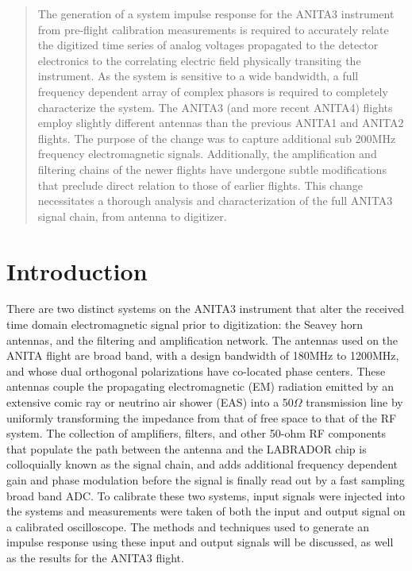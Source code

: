 %
%
%
%

	\begin{abstract}
	The generation of a system impulse response for the ANITA3 instrument from pre-flight calibration measurements is required to accurately relate the digitized time series of analog voltages propagated to the detector electronics to the correlating electric field physically transiting the instrument.  As the system is sensitive to a wide bandwidth, a full frequency dependent array of complex phasors is required to completely characterize the system.  The ANITA3 (and more recent ANITA4) flights employ slightly different antennas than the previous ANITA1 and ANITA2 flights.  The purpose of the change was to capture additional sub 200MHz frequency electromagnetic signals.  Additionally, the amplification and filtering chains of the newer flights have undergone subtle modifications that preclude direct relation to those of earlier flights.  This change necessitates a thorough analysis and characterization of the full ANITA3 signal chain, from antenna to digitizer.
	\end{abstract}
	
\section{Introduction}

	There are two distinct systems on the ANITA3 instrument that alter the received time domain electromagnetic signal prior to digitization: the Seavey horn antennas, and the filtering and amplification network.  The antennas used on the ANITA flight are broad band, with a design bandwidth of 180MHz to 1200MHz, and whose dual orthogonal polarizations have co-located phase centers.  These antennas couple the propagating electromagnetic (EM) radiation emitted by an extensive comic ray or neutrino air shower (EAS) into a 50$\Omega$ transmission line by uniformly transforming the impedance from that of free space to that of the RF system.  The collection of amplifiers, filters, and other 50-ohm RF components that populate the path between the antenna and the LABRADOR chip is colloquially known as the signal chain, and adds additional frequency dependent gain and phase modulation before the signal is finally read out by a fast sampling broad band ADC.  To calibrate these two systems, input signals were injected into the systems and measurements were taken of both the input and output signal on a calibrated oscilloscope.  The methods and techniques used to generate an impulse response using these input and output signals will be discussed, as well as the results for the ANITA3 flight.


